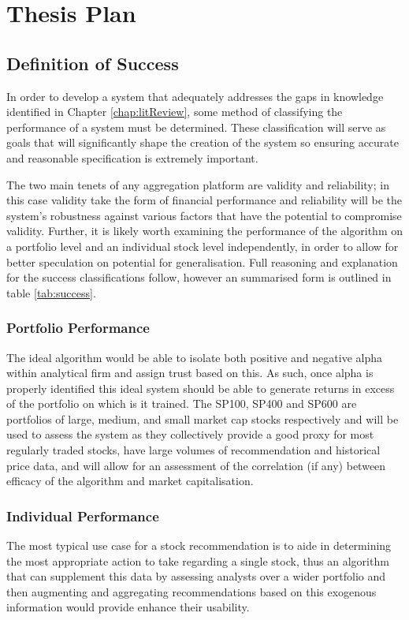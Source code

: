 \chapter{Thesis Plan}
\section{Definition of Success}\label{sec:success}
In order to develop a system that adequately addresses the gaps in knowledge identified in Chapter \ref{chap:litReview}, some method of classifying the performance of a system must be determined. These classification will serve as goals that will significantly shape the creation of the system so ensuring accurate and reasonable specification is extremely important.

The two main tenets of any aggregation platform are validity and reliability; in this case validity take the form of financial performance and reliability will be the system's robustness against various factors that have the potential to compromise validity. Further, it is likely worth examining the performance of the algorithm on a portfolio level and an individual stock level independently, in order to allow for better speculation on potential for generalisation. Full reasoning and explanation for the success classifications follow, however an summarised form is outlined in table \ref{tab:success}.

\subsection{Portfolio Performance}
The ideal algorithm would be able to isolate both positive and negative alpha within analytical firm and assign trust based on this. As such, once alpha is properly identified this ideal system should be able to generate returns in excess of the portfolio on which is it trained. The SP100, SP400 and SP600 are portfolios of large, medium, and small market cap stocks respectively and will be used to assess the system as they collectively provide a good proxy for most regularly traded stocks, have large volumes of recommendation and historical price data, and will allow for an assessment of the correlation (if any) between efficacy of the algorithm and market capitalisation.

\subsection{Individual Performance}
The most typical use case for a stock recommendation is to aide in determining the most appropriate action to take regarding a single stock, thus an algorithm that can supplement this data by assessing analysts over a wider portfolio and then augmenting and aggregating recommendations based on this exogenous information would provide enhance their usability.  

